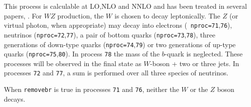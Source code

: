 
This process is calculable at LO,NLO and NNLO and has been treated in several papers, 
\cite{Campbell:1999ah,Campbell:2011bn,Boughezal:2016wmq,Campbell:2022gdq}.
For $WZ$ production, the $W$ is chosen to decay leptonically. The $Z$
(or virtual photon, when appropriate) may decay into electrons ({\tt
nproc=71},{\tt 76}), neutrinos ({\tt nproc=72},{\tt 77}), a pair of
bottom quarks ({\tt nproc=73},{\tt 78}), three generations of
down-type quarks ({\tt nproc=74},{\tt 79}) or two generations of
up-type quarks ({\tt nproc=75},{\tt 80}).  In process {\tt 78} the
mass of the $b$-quark is neglected.  These processes will be observed
in the final state as $W$-boson + two or three jets.  In processes
{\tt 72} and {\tt 77}, a sum is performed over all three species of
neutrinos.

When {\tt removebr} is true in processes {\tt 71} and {\tt 76},
neither the $W$ or the $Z$ boson decays.

